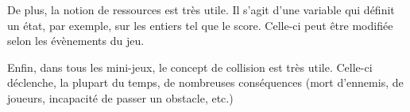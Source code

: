 De plus, la notion de ressources est très utile. Il s'agit d'une variable qui définit un état, par exemple, sur les entiers tel que le score.
Celle-ci peut être modifiée selon les évènements du jeu.

Enfin, dans tous les mini-jeux, le concept de collision est très utile. Celle-ci déclenche, la plupart du temps, de nombreuses conséquences (mort d'ennemis, de joueurs,
incapacité de passer un obstacle, etc.)
